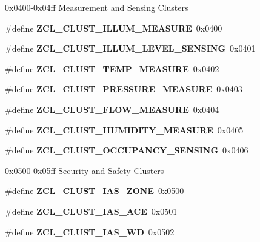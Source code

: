 \label{_amgrp01747264fe7bf50731df0522c351974e}%
0x0400-\/0x04ff Measurement and Sensing Clusters \begin{DoxyCompactItemize}
\item 
\mbox{\label{group__zcl_gae5d4f50414cbf30d92667430c6a3cfa9}} 
\#define {\bfseries Z\+C\+L\+\_\+\+C\+L\+U\+S\+T\+\_\+\+I\+L\+L\+U\+M\+\_\+\+M\+E\+A\+S\+U\+RE}~0x0400
\item 
\mbox{\label{group__zcl_ga9959f2e667fb70bfbae24ba82b27efd9}} 
\#define {\bfseries Z\+C\+L\+\_\+\+C\+L\+U\+S\+T\+\_\+\+I\+L\+L\+U\+M\+\_\+\+L\+E\+V\+E\+L\+\_\+\+S\+E\+N\+S\+I\+NG}~0x0401
\item 
\mbox{\label{group__zcl_gada1c1b659aa1618d26c3a8d35c2f8c7e}} 
\#define {\bfseries Z\+C\+L\+\_\+\+C\+L\+U\+S\+T\+\_\+\+T\+E\+M\+P\+\_\+\+M\+E\+A\+S\+U\+RE}~0x0402
\item 
\mbox{\label{group__zcl_ga415c4708f3e2c1d011a49f47b9f83a23}} 
\#define {\bfseries Z\+C\+L\+\_\+\+C\+L\+U\+S\+T\+\_\+\+P\+R\+E\+S\+S\+U\+R\+E\+\_\+\+M\+E\+A\+S\+U\+RE}~0x0403
\item 
\mbox{\label{group__zcl_gacd01cad291629fd4727bf9e0c7f894ad}} 
\#define {\bfseries Z\+C\+L\+\_\+\+C\+L\+U\+S\+T\+\_\+\+F\+L\+O\+W\+\_\+\+M\+E\+A\+S\+U\+RE}~0x0404
\item 
\mbox{\label{group__zcl_gae16b40a0813e06d1a730cb82d73bf1ae}} 
\#define {\bfseries Z\+C\+L\+\_\+\+C\+L\+U\+S\+T\+\_\+\+H\+U\+M\+I\+D\+I\+T\+Y\+\_\+\+M\+E\+A\+S\+U\+RE}~0x0405
\item 
\mbox{\label{group__zcl_gaf9aa3a90bc4b4192d92c37d5ef91b7b7}} 
\#define {\bfseries Z\+C\+L\+\_\+\+C\+L\+U\+S\+T\+\_\+\+O\+C\+C\+U\+P\+A\+N\+C\+Y\+\_\+\+S\+E\+N\+S\+I\+NG}~0x0406
\end{DoxyCompactItemize}
\label{_amgrp01747264fe7bf50731df0522c351974e}%
0x0500-\/0x05ff Security and Safety Clusters \begin{DoxyCompactItemize}
\item 
\mbox{\label{group__zcl_ga9b93acd32b917310f0336ac84d7efdea}} 
\#define {\bfseries Z\+C\+L\+\_\+\+C\+L\+U\+S\+T\+\_\+\+I\+A\+S\+\_\+\+Z\+O\+NE}~0x0500
\item 
\mbox{\label{group__zcl_ga442974e611b0c74732377892affefd11}} 
\#define {\bfseries Z\+C\+L\+\_\+\+C\+L\+U\+S\+T\+\_\+\+I\+A\+S\+\_\+\+A\+CE}~0x0501
\item 
\mbox{\label{group__zcl_ga4e118fcd980560cb3adb695997a48fd3}} 
\#define {\bfseries Z\+C\+L\+\_\+\+C\+L\+U\+S\+T\+\_\+\+I\+A\+S\+\_\+\+WD}~0x0502
\end{DoxyCompactItemize}
